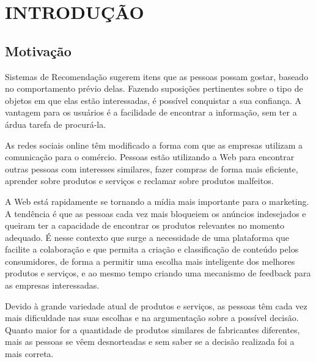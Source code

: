 \chapter{INTRODUÇÃO}  %

\section{Motivação} %
\label{sec:motivação}




 Sistemas de Recomendação sugerem itens que as pessoas possam gostar, baseado no comportamento prévio delas. Fazendo suposições pertinentes sobre o tipo de objetos em que elas estão interessadas, é possível conquistar a sua confiança. A vantagem para os usuários é a facilidade de encontrar a informação, sem ter a árdua tarefa de procurá-la.

 As redes sociais online têm modificado a forma com que as empresas utilizam a comunicação para o comércio. Pessoas estão utilizando a Web para encontrar outras pessoas com interesses similares, fazer compras de forma mais eficiente, aprender sobre produtos e serviços e reclamar sobre produtos malfeitos\cite{marketing_social_web}.

 A Web está rapidamente se tornando a mídia mais importante para o marketing. A tendência é que as pessoas cada vez mais bloqueiem os anúncios indesejados e queiram ter a capacidade de encontrar os produtos relevantes no momento adequado. É nesse contexto que surge a necessidade de uma plataforma que facilite a colaboração e que permita a criação e classificação de conteúdo pelos consumidores, de forma a permitir uma escolha mais inteligente dos melhores produtos e serviços, e ao mesmo tempo criando uma mecanismo de feedback para as empresas interessadas.

 Devido à grande variedade atual de produtos e serviços, as pessoas têm cada vez mais dificuldade nas suas escolhas e na argumentação sobre a possível decisão. Quanto maior for a quantidade de produtos similares de fabricantes diferentes, mais as pessoas se vêem desnorteadas e sem saber se a decisão realizada foi a mais correta.

